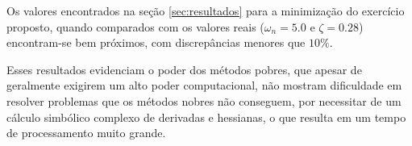 Os valores encontrados na seção \ref{sec:resultados} para a minimização do exercício proposto, quando comparados com os valores reais ($ \omega_n = 5.0 $  e  $ \zeta = 0.28 $) encontram-se bem próximos, com discrepâncias menores que $10\%$. 

Esses resultados evidenciam o poder dos métodos pobres, que apesar de geralmente exigirem um alto poder computacional, não mostram dificuldade em resolver problemas que os métodos nobres não conseguem, por necessitar de um cálculo simbólico complexo de derivadas e hessianas, o que resulta em um tempo de processamento muito grande.



